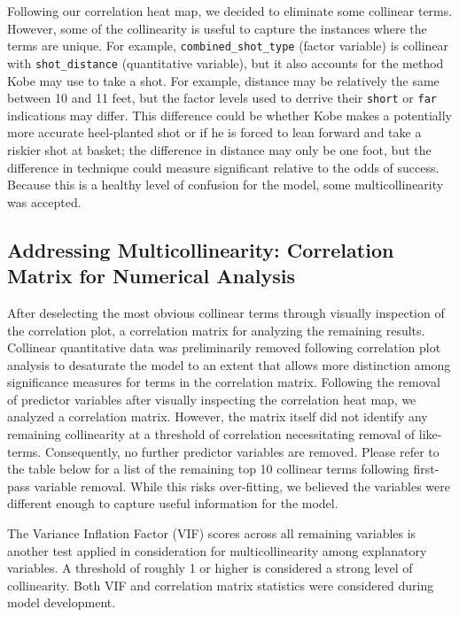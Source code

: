 \documentclass[american,]{article}
\begin{document}
Following our correlation heat map, we decided to eliminate some collinear terms. However, some of the collinearity is useful to capture the instances where the terms are unique. For example, \texttt{combined\_shot\_type} (factor variable) is collinear with \texttt{shot\_distance} (quantitative variable), but it also accounts for the method Kobe may use to take a shot. For example, distance may be relatively the same between 10 and 11 feet, but the factor levels used to derrive their \texttt{short} or \texttt{far} indications may differ. This difference could be whether Kobe makes a potentially more accurate heel-planted shot or if he is forced to lean forward and take a riskier shot at basket; the difference in distance may only be one foot, but the difference in technique could measure significant relative to the odds of success. Because this is a healthy level of confusion for the model, some multicollinearity was accepted.

\hypertarget{addressing-multicollinearity-correlation-matrix-for-numerical-analysis}{%
\subsection{\texorpdfstring{\textbf{Addressing Multicollinearity: Correlation Matrix for Numerical Analysis}}{Addressing Multicollinearity: Correlation Matrix for Numerical Analysis}}\label{addressing-multicollinearity-correlation-matrix-for-numerical-analysis}}

After deselecting the most obvious collinear terms through visually inspection of the correlation plot, a correlation matrix for analyzing the remaining results. Collinear quantitative data was preliminarily removed following correlation plot analysis to desaturate the model to an extent that allows more distinction among significance measures for terms in the correlation matrix. Following the removal of predictor variables after visually inspecting the correlation heat map, we analyzed a correlation matrix. However, the matrix itself did not identify any remaining collinearity at a threshold of correlation necessitating removal of like-terms. Consequently, no further predictor variables are removed. Please refer to the table below for a list of the remaining top 10 collinear terms following first-pass variable removal. While this risks over-fitting, we believed the variables were different enough to capture useful information for the model.

The Variance Inflation Factor (VIF) scores across all remaining variables is another test applied in consideration for multicollinearity among explanatory variables. A threshold of roughly 1 or higher is considered a strong level of collinearity. Both VIF and correlation matrix statistics were considered during model development.
\end{document}
